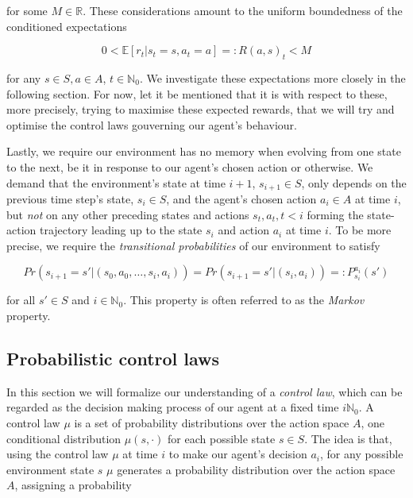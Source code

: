 \documentclass[11pt]{article} %
\begin{document}
for some $M \in \mathbb{R}$. These considerations amount to the uniform boundedness of the conditioned expectations 

\begin{equation}
	0 < \mathbb{E}[r_t | s_t = s, a_t = a] =: R(a,s)_t < M
\end{equation}

for any $s \in S, a \in A$, $t \in \mathbb{N}_0$. We investigate these expectations more closely in the following section. For now, let it be mentioned that it is with respect to these, more precisely, trying to maximise these expected rewards, that we will try and optimise the control laws gouverning our agent's behaviour.

Lastly, we require our environment has no memory when evolving from one state to the next, be it in response to our agent's chosen action or otherwise. We demand that the environment's state at time $i+1$, $s_{i+1} \in S$, only depends on the previous time step's state, $s_i \in S$, and the agent's chosen action $a_i \in A$ at time $i$, but \textit{not} on any other preceding states and actions $s_t, a_t, t < i$ forming the state-action trajectory leading up to the state $s_i$ and action $a_i$ at time $i$. To be more precise, we require the \textit{transitional probabilities} of our environment to satisfy

\begin{equation}\label{transProbMarkov}
	Pr(s_{i+1} = s' | (s_0, a_0, \dots, s_i, a_i)) = Pr(s_{i+1} = s' | (s_i,a_i)) =: P^{a_i}_{s_i} (s')
\end{equation}

for all $s' \in S$ and $i \in \mathbb{N}_0$. This property is often referred to as the \textit{Markov} property.

\subsection{Probabilistic control laws}\label{probControlLaws}

In this section we will formalize our understanding of a \textit{control law}, which can be regarded as the decision making process of our agent at a fixed time $i \mathbb{N}_0$. A control law $\mu$ is a set of probability distributions over the action space $A$, one conditional distribution $\mu(s, \cdot)$ for each possible state $s \in S$. The idea is that, using the control law $\mu$ at time $i$ to make our agent's decision $a_i$, for any possible environment state $s$ $\mu$ generates a probability distribution over the action space $A$, assigning a probability
\end{document}
